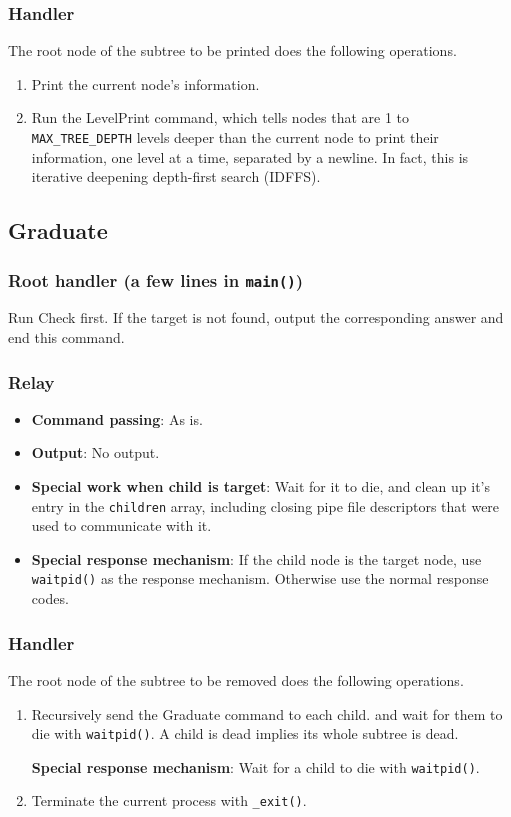 \documentclass[12pt, a4paper]{article}
\begin{document}
  \subsubsection{Handler}
  The root node of the subtree to be printed does the following operations.
  \begin{enumerate}
    \item Print the current node's information.
    \item Run the LevelPrint command, which tells nodes that are 1 to
    \verb|MAX_TREE_DEPTH| levels deeper than the current node to print their
    information, one level at a time, separated by a newline.
    In fact, this is iterative deepening depth-first search (IDFFS).
  \end{enumerate}

  \subsection{Graduate}
  \subsubsection{Root handler (a few lines in \texttt{main()})}
  Run Check first. If the target is not found, output the corresponding answer
  and end this command.

  \subsubsection{Relay}
  \begin{itemize}
    \item \textbf{Command passing}: As is.
    \item \textbf{Output}: No output.
    \item \textbf{Special work when child is target}: Wait for it to die, and clean up
    it's entry in the \verb|children| array, including closing pipe file descriptors that
    were used to communicate with it.
    \item \textbf{Special response mechanism}: If the child node is the target node,
    use \verb|waitpid()| as the response mechanism. Otherwise use the normal
    response codes.
  \end{itemize}

  \subsubsection{Handler}
  The root node of the subtree to be removed does the following operations.
  \begin{enumerate}
    \item Recursively send the Graduate command to each child. and wait for them
    to die with \verb|waitpid()|. A child is dead implies its whole subtree is
    dead.
    \par\textbf{Special response mechanism}: Wait for a child to die with \verb|waitpid()|.
    \item Terminate the current process with \verb|_exit()|.
  \end{enumerate}
\end{document}
